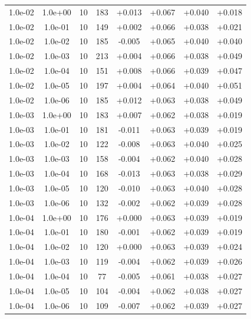 \documentclass[11pt,a4paper]{article}
\begin{document}
\begin{table}
{\begin{tabular}{*{8}c}
 1.0e-02 	 & 1.0e+00 	 & 10 & 183 	 & +0.013 & +0.067 & +0.040 & +0.018 \\ 
 1.0e-02 	 & 1.0e-01 	 & 10 & 149 	 & +0.002 & +0.066 & +0.038 & +0.021 \\ 
 1.0e-02 	 & 1.0e-02 	 & 10 & 185 	 & -0.005 & +0.065 & +0.040 & +0.040 \\ 
 1.0e-02 	 & 1.0e-03 	 & 10 & 213 	 & +0.004 & +0.066 & +0.038 & +0.049 \\ 
 1.0e-02 	 & 1.0e-04 	 & 10 & 151 	 & +0.008 & +0.066 & +0.039 & +0.047 \\ 
 1.0e-02 	 & 1.0e-05 	 & 10 & 197 	 & +0.004 & +0.064 & +0.040 & +0.051 \\ 
 1.0e-02 	 & 1.0e-06 	 & 10 & 185 	 & +0.012 & +0.063 & +0.038 & +0.049 \\ 

 1.0e-03 	 & 1.0e+00 	 & 10 & 183 	 & +0.007 & +0.062 & +0.038 & +0.019 \\ 
 1.0e-03 	 & 1.0e-01 	 & 10 & 181 	 & -0.011 & +0.063 & +0.039 & +0.019 \\ 
 1.0e-03 	 & 1.0e-02 	 & 10 & 122 	 & -0.008 & +0.063 & +0.040 & +0.025 \\ 
 1.0e-03 	 & 1.0e-03 	 & 10 & 158 	 & -0.004 & +0.062 & +0.040 & +0.028 \\ 
 1.0e-03 	 & 1.0e-04 	 & 10 & 168 	 & -0.013 & +0.063 & +0.038 & +0.029 \\ 
 1.0e-03 	 & 1.0e-05 	 & 10 & 120 	 & -0.010 & +0.063 & +0.040 & +0.028 \\ 
 1.0e-03 	 & 1.0e-06 	 & 10 & 132 	 & -0.002 & +0.062 & +0.039 & +0.028 \\ 

 1.0e-04 	 & 1.0e+00 	 & 10 & 176 	 & +0.000 & +0.063 & +0.039 & +0.019 \\ 
 1.0e-04 	 & 1.0e-01 	 & 10 & 180 	 & -0.001 & +0.062 & +0.039 & +0.019 \\ 
 1.0e-04 	 & 1.0e-02 	 & 10 & 120 	 & +0.000 & +0.063 & +0.039 & +0.024 \\ 
 1.0e-04 	 & 1.0e-03 	 & 10 & 119 	 & -0.004 & +0.062 & +0.039 & +0.026 \\ 
 1.0e-04 	 & 1.0e-04 	 & 10 & 77 	 & -0.005 & +0.061 & +0.038 & +0.027 \\ 
 1.0e-04 	 & 1.0e-05 	 & 10 & 104 	 & -0.004 & +0.062 & +0.038 & +0.027 \\ 
 1.0e-04 	 & 1.0e-06 	 & 10 & 109 	 & -0.007 & +0.062 & +0.039 & +0.027 \\ 


\end{tabular}}
\end{table}
\end{document}
